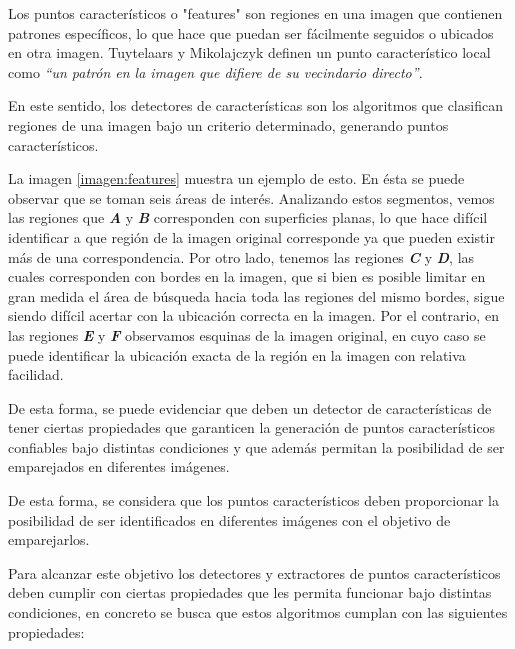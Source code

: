 Los puntos característicos o "features" son regiones en una imagen que contienen patrones específicos, lo que hace que puedan ser fácilmente seguidos o ubicados en otra imagen. Tuytelaars y Mikolajczyk \cite{Tuytelaars} definen un punto característico local como \textit{``un patrón en la imagen que difiere de su vecindario directo''}. 

En este sentido, los detectores de características son los algoritmos que clasifican regiones de una imagen bajo un criterio determinado, generando puntos característicos.

La imagen \ref{imagen:features} muestra un ejemplo de esto. En ésta se puede observar que se toman seis áreas de interés. Analizando estos segmentos, vemos las regiones que \textbf{\textit{A}} y \textbf{\textit{B}} corresponden con superficies planas, lo que hace difícil  identificar a que región de la imagen original corresponde ya que pueden existir más de una correspondencia. Por otro lado, tenemos las regiones \textbf{\textit{C}} y \textbf{\textit{D}}, las cuales corresponden con bordes en la imagen, que si bien es posible limitar en gran medida el área de búsqueda hacia toda las regiones del mismo bordes, sigue siendo difícil acertar con la ubicación correcta en la imagen. Por el contrario, en las regiones \textbf{\textit{E}} y \textbf{\textit{F}} observamos esquinas de la imagen original, en cuyo caso se puede identificar  la ubicación exacta de la región en la imagen con relativa facilidad.

De esta forma, se puede evidenciar que deben un detector de características de tener ciertas propiedades que garanticen la generación de puntos característicos confiables bajo distintas condiciones y que además permitan la posibilidad de ser emparejados en diferentes imágenes.


De esta forma, se considera que los puntos característicos deben proporcionar la posibilidad de ser identificados en diferentes imágenes con el objetivo de emparejarlos.

Para alcanzar este objetivo los detectores y extractores de puntos característicos deben cumplir con ciertas propiedades que les permita funcionar bajo distintas condiciones, en concreto se busca que estos algoritmos cumplan con las siguientes propiedades:

